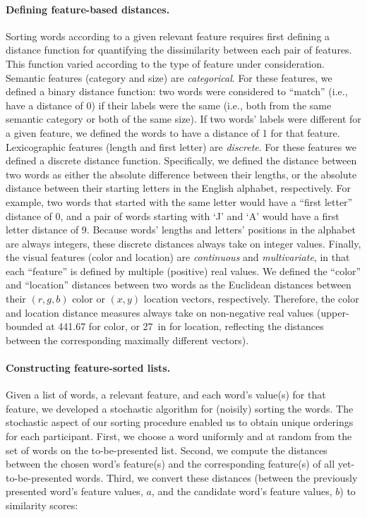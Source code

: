 \documentclass[11pt]{article}
\begin{document}
\paragraph{Defining feature-based distances.} Sorting words according to a
given relevant feature requires first defining a distance function for
quantifying the dissimilarity between each pair of features. This function
varied according to the type of feature under consideration. Semantic features
(category and size) are \textit{categorical}. For these features, we defined a
binary distance function: two words were considered to ``match'' (i.e., have a
distance of 0) if their labels were the same (i.e., both from the same semantic
category or both of the same size). If two words' labels were different for a
given feature, we defined the words to have a distance of 1 for that feature.
Lexicographic features (length and first letter) are \textit{discrete}. For
these features we defined a discrete distance function. Specifically, we
defined the distance between two words as either the absolute difference
between their lengths, or the absolute distance between their starting letters
in the English alphabet, respectively. For example, two words that started with
the same letter would have a ``first letter'' distance of 0, and a pair of
words starting with `J' and `A' would have a first letter distance of 9.
Because words' lengths and letters' positions in the alphabet are always
integers, these discrete distances always take on integer values. Finally, the
visual features (color and location) are \textit{continuous} and
\textit{multivariate}, in that each ``feature'' is defined by multiple
(positive) real values. We defined the ``color'' and ``location'' distances
between two words as the Euclidean distances between their $(r, g, b)$ color or
$(x, y)$ location vectors, respectively. Therefore, the color and location
distance measures always take on non-negative real values (upper-bounded at
441.67 for color, or 27~in for location, reflecting the distances between the
corresponding maximally different vectors).

\paragraph{Constructing feature-sorted lists.} Given a list of words, a
relevant feature, and each word's value(s) for that feature, we developed a
stochastic algorithm for (noisily) sorting the words. The stochastic aspect of
our sorting procedure enabled us to obtain unique orderings for each
participant. First, we choose a word uniformly and at random from the set of
words on the to-be-presented list. Second, we compute the distances between the
chosen word's feature(s) and the corresponding feature(s) of all
yet-to-be-presented words. Third, we convert these distances (between the
previously presented word's feature values, $a$, and the candidate word's
feature values, $b$) to similarity scores:
\end{document}
